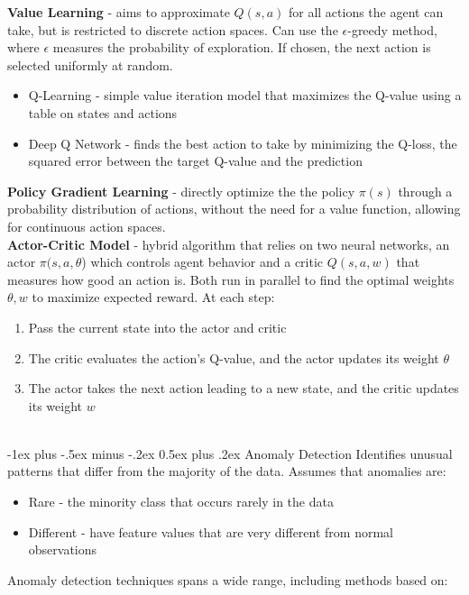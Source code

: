 \documentclass[10pt,landscape]{article}
\makeatletter
\renewcommand{\section}{\@startsection{section}{1}{0mm}%
                                {-1ex plus -.5ex minus -.2ex}%
                                {0.5ex plus .2ex}%
                                {\normalfont\large\bfseries}}
\makeatother
\begin{document}
\begin{multicols}{3}
    \textbf{Value Learning} - aims to approximate $Q(s,a)$ for all actions the agent can take, but is restricted to discrete action spaces. Can use the $\epsilon$-greedy method, where $\epsilon$ measures the probability of exploration. If chosen, the next action is selected uniformly at random.
    \begin{itemize}[label={--},leftmargin=4mm]
        \itemsep -.4mm
        \item Q-Learning - simple value iteration model that maximizes the Q-value using a table on states and actions
        \item Deep Q Network - finds the best action to take by minimizing the Q-loss, the squared error between the target Q-value and the prediction
    \end{itemize}

    \textbf{Policy Gradient Learning} - directly optimize the the policy $\pi(s)$ through a probability distribution of actions, without the need for a value function, allowing for continuous action spaces.  \\
    \smallskip
    \textbf{Actor-Critic Model} - hybrid algorithm that relies on two neural networks, an actor $\pi(s,a,\theta$) which controls agent behavior  and a critic $Q(s,a,w)$ that measures how good an action is. Both run in parallel to find the optimal weights $\theta, w$ to maximize expected reward. At each step:
        \begin{enumerate}[leftmargin=5mm]
            \itemsep -.4mm
            \item Pass the current state into the actor and critic
            \item The critic evaluates the action's Q-value, and the actor updates its weight $\theta$
            \item The actor takes the next action leading to a new state, and the critic updates its weight $w$
        \end{enumerate}
        \columnbreak

        \textcolor{white}{.}\vspace{-4mm}\\ %
        \section{Anomaly Detection}
        Identifies unusual patterns that differ from the majority of the data. Assumes that anomalies are:
        \begin{itemize}[label={--},leftmargin=4mm]
            \itemsep -.4mm
            \item Rare - the minority class that occurs rarely in the data
            \item Different - have feature values that are very different from normal observations
        \end{itemize}
        Anomaly detection techniques spans a wide range, including methods based on:


\end{multicols}
\end{document}
